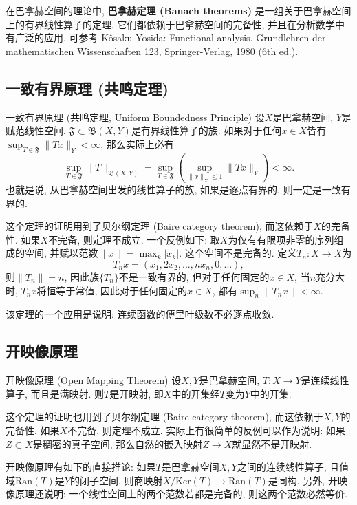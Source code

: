 
在巴拿赫空间的理论中, \textbf{巴拿赫定理 (Banach theorems)} 是一组关于巴拿赫空间上的有界线性算子的定理. 它们都依赖于巴拿赫空间的完备性, 并且在分析数学中有广泛的应用. 可参考 Kôsaku Yosida: Functional analysis. Grundlehren der mathematischen Wissenschaften 123, Springer-Verlag, 1980 (6th ed.).

\subsection{一致有界原理 (共鸣定理)}
\begin{theorem}{一致有界原理 (共鸣定理, Uniform Boundedness Principle)}
设$X$是巴拿赫空间, $Y$是赋范线性空间, $\mathfrak{F}\subset\mathfrak{B}(X,Y)$是有界线性算子的族. 如果对于任何$x\in X$皆有$\sup_{T\in\mathfrak{F}}\|Tx\|_Y<\infty$, 那么实际上必有
$$
\sup_{T\in\mathfrak{F}}\|T\|_{\mathfrak{B}(X,Y)}
=\sup_{T\in\mathfrak{F}}\left(\sup_{\|x\|_X\leq 1}\|Tx\|_Y\right)<\infty.
$$
也就是说, 从巴拿赫空间出发的线性算子的族, 如果是逐点有界的, 则一定是一致有界的. 
\end{theorem}
这个定理的证明用到了贝尔纲定理 (Baire category theorem), 而这依赖于$X$的完备性. 如果$X$不完备, 则定理不成立. 一个反例如下: 取$X$为仅有有限项非零的序列组成的空间, 并赋以范数$\|x\|=\max_{k}|x_k|$. 这个空间不是完备的. 定义$T_n:X\to X$为
$$
T_nx=(x_1,2x_2,...,nx_n,0,...),
$$
则$\|T_n\|=n$, 因此族$\{T_n\}$不是一致有界的, 但对于任何固定的$x\in X$, 当$n$充分大时, $T_nx$将恒等于常值, 因此对于任何固定的$x\in X$, 都有$\sup_n\|T_nx\|<\infty$.

该定理的一个应用是说明: 连续函数的傅里叶级数不必逐点收敛. 

\subsection{开映像原理}
\begin{theorem}{开映像原理 (Open Mapping Theorem)}
设$X,Y$是巴拿赫空间, $T:X\to Y$是连续线性算子, 而且是满映射. 则$T$是开映射, 即$X$中的开集经$T$变为$Y$中的开集.
\end{theorem}

这个定理的证明也用到了贝尔纲定理 (Baire category theorem), 而这依赖于$X,Y$的完备性. 如果$X$不完备, 则定理不成立. 实际上有很简单的反例可以作为说明: 如果$Z\subset X$是稠密的真子空间, 那么自然的嵌入映射$Z\to X$就显然不是开映射.

开映像原理有如下的直接推论: 如果$T$是巴拿赫空间$X,Y$之间的连续线性算子, 且值域$\text{Ran}(T)$是$Y$的闭子空间, 则商映射$X/\text{Ker}(T)\to \text{Ran}(T)$是同构. 另外, 开映像原理还说明: 一个线性空间上的两个范数若都是完备的, 则这两个范数必然等价.

